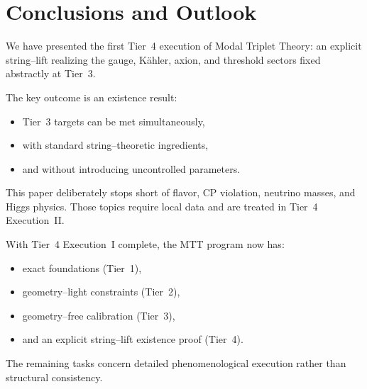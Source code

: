 \documentclass[11pt]{article}
\begin{document}
\section{Conclusions and Outlook}

We have presented the first Tier~4 execution of Modal Triplet Theory:
an explicit string--lift realizing the gauge, K\"ahler, axion, and
threshold sectors fixed abstractly at Tier~3.

The key outcome is an existence result:
\begin{itemize}
  \item Tier~3 targets can be met simultaneously,
  \item with standard string--theoretic ingredients,
  \item and without introducing uncontrolled parameters.
\end{itemize}

This paper deliberately stops short of flavor, CP violation, neutrino
masses, and Higgs physics.
Those topics require local data and are treated in
Tier~4 Execution~II.

With Tier~4 Execution~I complete, the MTT program now has:
\begin{itemize}
  \item exact foundations (Tier~1),
  \item geometry--light constraints (Tier~2),
  \item geometry--free calibration (Tier~3),
  \item and an explicit string--lift existence proof (Tier~4).
\end{itemize}

The remaining tasks concern detailed phenomenological execution rather
than structural consistency.
\end{document}
